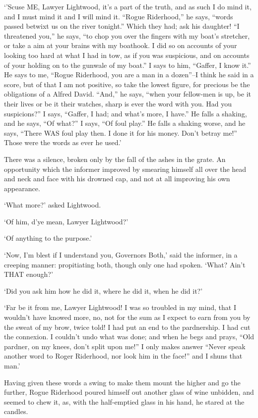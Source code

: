 ‘’Scuse ME, Lawyer Lightwood, it’s a part of the truth, and as such I
do mind it, and I must mind it and I will mind it. “Rogue Riderhood,”
 he says, “words passed betwixt us on the river tonight.” Which they had;
ask his daughter! “I threatened you,” he says, “to chop you over the
fingers with my boat’s stretcher, or take a aim at your brains with my
boathook. I did so on accounts of your looking too hard at what I had in
tow, as if you was suspicious, and on accounts of your holding on to the
gunwale of my boat.” I says to him, “Gaffer, I know it.” He says to me,
“Rogue Riderhood, you are a man in a dozen”--I think he said in a score,
but of that I am not positive, so take the lowest figure, for precious
be the obligations of a Alfred David. “And,” he says, “when your
fellow-men is up, be it their lives or be it their watches, sharp is
ever the word with you. Had you suspicions?” I says, “Gaffer, I had;
and what’s more, I have.” He falls a shaking, and he says, “Of what?” I
says, “Of foul play.” He falls a shaking worse, and he says, “There WAS
foul play then. I done it for his money. Don’t betray me!” Those were
the words as ever he used.’

There was a silence, broken only by the fall of the ashes in the grate.
An opportunity which the informer improved by smearing himself all
over the head and neck and face with his drowned cap, and not at all
improving his own appearance.

‘What more?’ asked Lightwood.

‘Of him, d’ye mean, Lawyer Lightwood?’

‘Of anything to the purpose.’

‘Now, I’m blest if I understand you, Governors Both,’ said the informer,
in a creeping manner: propitiating both, though only one had spoken.
‘What? Ain’t THAT enough?’

‘Did you ask him how he did it, where he did it, when he did it?’

‘Far be it from me, Lawyer Lightwood! I was so troubled in my mind, that
I wouldn’t have knowed more, no, not for the sum as I expect to earn
from you by the sweat of my brow, twice told! I had put an end to the
pardnership. I had cut the connexion. I couldn’t undo what was done; and
when he begs and prays, “Old pardner, on my knees, don’t split upon me!”
 I only makes answer “Never speak another word to Roger Riderhood, nor
look him in the face!” and I shuns that man.’

Having given these words a swing to make them mount the higher and go
the further, Rogue Riderhood poured himself out another glass of wine
unbidden, and seemed to chew it, as, with the half-emptied glass in his
hand, he stared at the candles.

